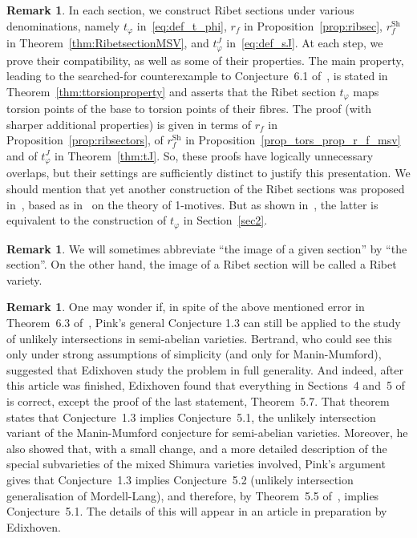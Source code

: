 \documentclass[11pt]{article}
\theoremstyle{plain}
\theoremstyle{definition}
\newtheorem{Remark}[subsection]{Remark}
\numberwithin{equation}{subsection}
\let\phi\varphi
\newcommand{\Sh}{\mathrm{Sh}}
\begin{document}
\begin{Remark}
In each section, we construct Ribet sections under various
denominations, namely $t_\phi$ in~\eqref{eq:def_t_phi}, $r_f$ in
Proposition~\ref{prop:ribsec}, $r^\Sh_f$ in Theorem~\ref{thm:RibetsectionMSV},
and $t^J_\phi$ in~\eqref{eq:def_sJ}. At each step, we prove their
compatibility, as well as some of their properties. The main
property, leading to the searched-for counterexample to
Conjecture~6.1 of~\cite{Pink2}, is stated in
Theorem~\ref{thm:ttorsionproperty} and asserts that the Ribet section
$t_\phi$ maps torsion points of the base to torsion points of their
fibres. The proof (with sharper additional properties) is given in
terms of $r_f$ in Proposition~\ref{prop:ribsectors}, of $r^\Sh_f$ in
Proposition~\ref{prop_tors_prop_r_f_msv} and of
$t^J_\phi$ in Theorem~\ref{thm:tJ}. So, these proofs have logically
unnecessary overlaps, but their settings are sufficiently distinct
to justify this presentation. We should mention that yet another
construction of the Ribet sections was proposed
in~\cite{Bertrand11}, based as in~\cite{Jacquinot-Ribet} on the
theory of 1-motives. But as shown in~\cite{Chambert-Loir99}, the latter
is equivalent to the construction of $t_\phi$ in Section~\ref{sec2}.
\end{Remark}
\begin{Remark}
We will sometimes abbreviate ``the image of a given section'' by
``the section''. On the other hand, the image of a Ribet section
will be called a Ribet variety.
\end{Remark}
\begin{Remark}
One may wonder if, in spite of the above mentioned error in
Theorem~6.3 of~\cite{Pink2}, Pink's general Conjecture 1.3 can still
be applied to the study of unlikely intersections in semi-abelian
varieties. Bertrand, who could see this only under strong
assumptions of simplicity (and only for Manin-Mumford), suggested
that Edixhoven study the problem in full generality. And indeed,
after this article was finished, Edixhoven found that everything in
Sections~4 and~5 of~\cite{Pink2} is correct, except the proof of the
last statement, Theorem~5.7. That theorem states that Conjecture~1.3
implies Conjecture~5.1, the unlikely intersection variant of the
Manin-Mumford conjecture for semi-abelian varieties. Moreover, he
also showed that, with a small change, and a more detailed
description of the special subvarieties of the mixed Shimura
varieties involved, Pink's argument gives that Conjecture~1.3
implies Conjecture~5.2 (unlikely intersection generalisation of
Mordell-Lang), and therefore, by Theorem~5.5 of~\cite{Pink2},
implies Conjecture~5.1. The details of this will appear in an
article in preparation by Edixhoven.
\end{Remark}
\end{document}
